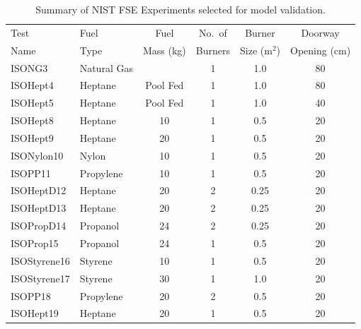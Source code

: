 \begin{table}[p]
\caption{Summary of NIST FSE Experiments selected for model validation.}
\begin{center}
\begin{tabular}{|l|l|c|c|c|c|}
\hline
Test          &  Fuel         &  Fuel      &  No.~of   &  Burner       &  Doorway          \\
Name          &  Type         &  Mass (kg) &  Burners  &  Size (m$^2$) &  Opening (cm)     \\ \hline \hline
ISONG3        &  Natural Gas  &            &  1        &  1.0          &  80               \\ \hline
ISOHept4      &  Heptane      &  Pool Fed  &  1        &  1.0          &  80               \\ \hline
ISOHept5      &  Heptane      &  Pool Fed  &  1        &  1.0          &  40               \\ \hline
ISOHept8      &  Heptane      &  10        &  1        &  0.5          &  20               \\ \hline
ISOHept9      &  Heptane      &  20        &  1        &  0.5          &  20               \\ \hline
ISONylon10    &  Nylon        &  10        &  1        &  0.5          &  20               \\ \hline
ISOPP11       &  Propylene    &  10        &  1        &  0.5          &  20               \\ \hline
ISOHeptD12    &  Heptane      &  20        &  2        &  0.25         &  20               \\ \hline
ISOHeptD13    &  Heptane      &  20        &  2        &  0.25         &  20               \\ \hline
ISOPropD14    &  Propanol     &  24        &  2        &  0.25         &  20               \\ \hline
ISOProp15     &  Propanol     &  24        &  1        &  0.5          &  20               \\ \hline
ISOStyrene16  &  Styrene      &  10        &  1        &  0.5          &  20               \\ \hline
ISOStyrene17  &  Styrene      &  30        &  1        &  1.0          &  20               \\ \hline
ISOPP18       &  Propylene    &  20        &  2        &  0.5          &  20               \\ \hline
ISOHept19     &  Heptane      &  20        &  1        &  0.5          &  20               \\ \hline

\end{tabular}
\end{center}
\end{table}
